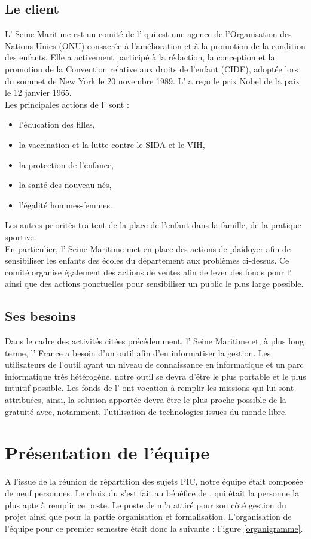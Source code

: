 \documentclass[asi]{picInsa}
\begin{document}
\subsection*{Le client}
L'\nomClient{} Seine Maritime est un comité de l'\nomClient{} qui est une agence de l'Organisation des Nations Unies (ONU) consacrée à l'amélioration et à la promotion de la condition des enfants. Elle a activement participé à la rédaction, la conception et la promotion de la Convention relative aux droits de l'enfant (CIDE), adoptée lors du sommet de New York le 20 novembre 1989. L'\nomClient{} a reçu le prix Nobel de la paix le 12 janvier 1965. \\
Les principales actions de l'\nomClient{} sont : \begin{itemize}
\item l'éducation des filles,
\item la vaccination et la lutte contre le SIDA et le VIH,
\item la protection de l'enfance,
\item la santé des nouveau-nés,
\item l'égalité hommes-femmes.
\end{itemize}
Les autres priorités traitent de la place de l'enfant dans la famille, de la pratique sportive.\\
En particulier, l'\nomClient{} Seine Maritime met en place des actions de plaidoyer afin de sensibiliser les enfants des écoles du département aux problèmes ci-dessus. Ce comité organise également des actions de ventes afin de lever des fonds pour l'\nomClient{} ainsi que des actions ponctuelles pour sensibiliser un public le plus large possible.

\subsection*{Ses besoins}
Dans le cadre des activités citées précédemment, l'\nomClient{} Seine Maritime et, à plus long terme, l'\nomClient{} France a besoin d'un outil afin d'en informatiser la gestion. Les utilisateurs de l'outil ayant un niveau de connaissance en informatique et un parc informatique très hétérogène, notre outil se devra d'être le plus portable et le plus intuitif possible. Les fonds de l'\nomClient{} ont vocation à remplir les missions qui lui sont attribuées, ainsi, la solution apportée devra être le plus proche possible de la gratuité avec, notamment, l'utilisation de technologies issues du monde libre. \newpage

\section{Présentation de l'équipe}
A l’issue de la réunion de répartition des sujets PIC, notre équipe était composée de
neuf personnes. Le choix du \CP{} s’est fait au bénéfice de \Sergi{}, qui était la personne la plus apte à remplir ce poste.
Le poste de \RQ{} m'a attiré pour son côté gestion du projet ainsi que pour la partie organisation et formalisation.
L’organisation de l’équipe pour ce premier semestre était donc la suivante : Figure \ref{organigramme}.
\end{document}
